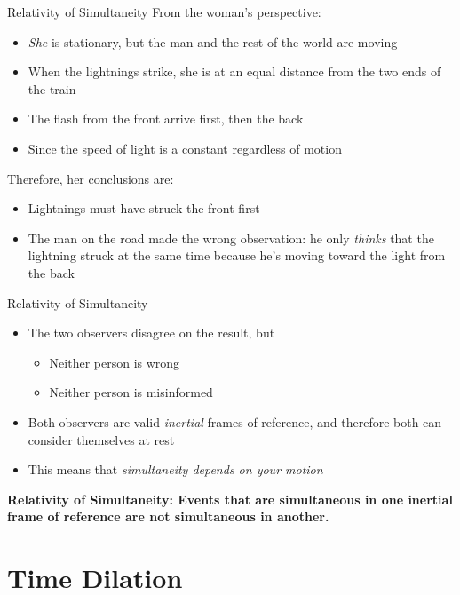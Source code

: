 \documentclass[12pt,compress,aspectratio=169]{beamer}
\begin{document}
\begin{frame}{Relativity of Simultaneity}
  From the woman's perspective:
  \begin{itemize}
  \item\emph{She} is stationary, but the man and the rest of the world are
    moving
  \item When the lightnings strike, she is at an equal distance from the two
    ends of the train
  \item The flash from the front arrive first, then the back
  \item Since the speed of light is a constant regardless of motion
  \end{itemize}
  Therefore, her conclusions are:
  \begin{itemize}
  \item Lightnings must have struck the front first
  \item The man on the road made the wrong observation: he only \emph{thinks}
    that the lightning struck at the same time because he's moving toward the
    light from the back
  \end{itemize}
\end{frame}


\begin{frame}{Relativity of Simultaneity}
  \begin{itemize}
  \item The two observers disagree on the result, but
    \begin{itemize}
    \item Neither person is wrong
    \item Neither person is misinformed
    \end{itemize}
  \item Both observers are valid \emph{inertial} frames of reference, and
    therefore both can consider themselves at rest
  \item This means that \emph{simultaneity depends on your motion}
  \end{itemize}
  
  \vspace{.2in}\textbf{Relativity of Simultaneity: Events that are simultaneous
    in one inertial frame of reference are not simultaneous in another.}
\end{frame}



\section{Time Dilation}
\end{document}
